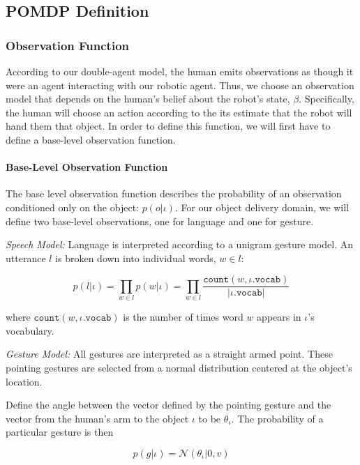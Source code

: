 \documentclass{article}
\begin{document}
\subsection{POMDP Definition}

\subsubsection{Observation Function}

According to our double-agent model, the human emits observations as though it were an agent interacting with our robotic agent. Thus, we choose an observation model that depends on the human's belief about the robot's state, $\beta$. Specifically, the human will choose an action according to the its estimate that the robot will hand them that object. In order to define this function, we will first have to define a base-level observation function. 

\paragraph{Base-Level Observation Function}

The base level observation function describes the probability of an observation conditioned only on the object: $p(o|\iota)$. For our object delivery domain, we will define two base-level observations, one for language and one for gesture. 

\noindent\textit{Speech Model:} Language is interpreted according to a unigram gesture model. An utterance $l$ is broken down into individual words, $w \in l$: 

\begin{equation}
	p(l|\iota) = \prod_{w \in l} p(w|\iota) = \prod_{w\in l} \frac{\texttt{count}(w, \iota.\texttt{vocab})}{|\iota.\texttt{vocab}|}
\end{equation}

where $\texttt{count}(w, \iota.\texttt{vocab})$ is the number of times word $w$ appears in $\iota$'s vocabulary. 

\noindent\textit{Gesture Model:} All gestures are interpreted as a straight armed point. These pointing gestures are selected from a normal distribution centered at the object's location. 

Define the angle between the vector defined by the pointing gesture and the vector from the human's arm to the object $\iota$ to be $\theta_\iota$. The probability of a particular gesture is then

\begin{equation}
p(g|\iota) = \mathcal{N}(\theta_\iota | 0, v)
\end{equation}
\end{document}
